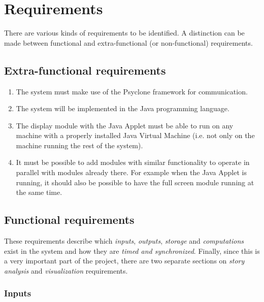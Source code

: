\chapter{\label{cpt:requirements}Requirements}

There are various kinds of requirements to be identified. A distinction can be
made between functional and extra-functional (or non-functional) requirements.

\section{Extra-functional requirements}

\begin{enumerate}
  \item The system must make use of the Psyclone framework for communication.
  \item The system will be implemented in the Java programming language.
  \item The display module with the Java Applet must be able to run on any
        machine with a properly installed Java Virtual Machine (i.e. not only
        on the machine running the rest of the system).
  \item It must be possible to add modules with similar functionality to
        operate in parallel with modules already there. For example when the
        Java Applet is running, it should also be possible to have the full
        screen module running at the same time. 
\end{enumerate}

\section{Functional requirements}

These requirements describe which \emph{inputs}, \emph{outputs}, \emph{storage}
and \emph{computations} exist in the system and how they are \emph{timed and
synchronized}. Finally, since this is a very important part of the project,
there are two separate sections on \emph{story analysis} and
\emph{visualization} requirements.

\subsection{Inputs}

